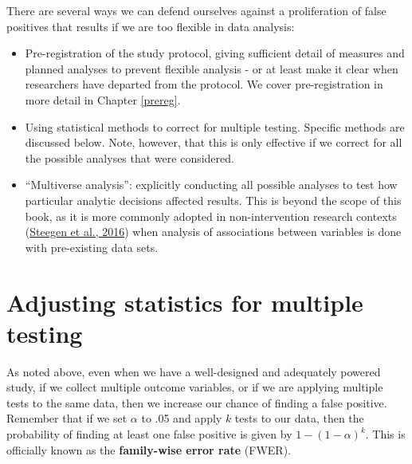 \documentclass{krantz}
\begin{document}
There are several ways we can defend ourselves against a proliferation of false positives that results if we are too flexible in data analysis:

\begin{itemize}
\item
  Pre-registration of the study protocol, giving sufficient detail of measures and planned analyses to prevent flexible analysis - or at least make it clear when researchers have departed from the protocol. We cover pre-registration in more detail in Chapter \ref{prereg}.
\item
  Using statistical methods to correct for multiple testing. Specific methods are discussed below. Note, however, that this is only effective if we correct for all the possible analyses that were considered.
\item
  ``Multiverse analysis'': explicitly conducting all possible analyses to test how particular analytic decisions affected results. This is beyond the scope of this book, as it is more commonly adopted in non-intervention research contexts (\protect\hyperlink{ref-steegen2016}{Steegen et al., 2016}) when analysis of associations between variables is done with pre-existing data sets.
\end{itemize}

\hypertarget{adjusting-statistics-for-multiple-testing}{%
\section{Adjusting statistics for multiple testing}\label{adjusting-statistics-for-multiple-testing}}

As noted above, even when we have a well-designed and adequately powered study, if we collect multiple outcome variables, or if we are applying multiple tests to the same data, then we increase our chance of finding a false positive. Remember that if we set \(\alpha\) to .05 and apply \(k\) tests to our data, then the probability of finding at least one false positive is given by \(1-(1-\alpha)^{k}\). This is officially known as the \textbf{family-wise error rate} (FWER).
\end{document}
